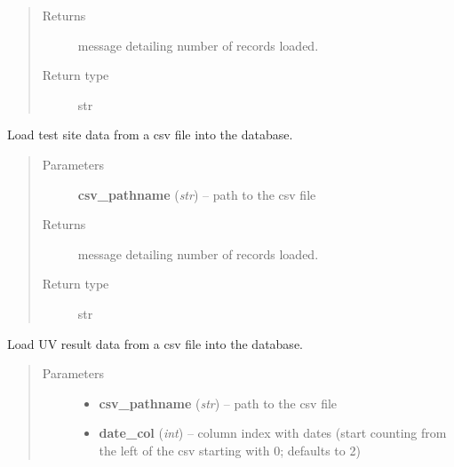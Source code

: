 \documentclass[letterpaper,10pt,english]{sphinxmanual}
\begin{document}
\begin{fulllineitems}
\begin{fulllineitems}
\begin{quote}
\begin{description}
\item[{Returns}] \leavevmode
message detailing number of records loaded.

\item[{Return type}] \leavevmode
str

\end{description}\end{quote}

\end{fulllineitems}


\begin{fulllineitems}
\label{modules:webb_utils.upload_data.UploadData.load_test_site_data}
Load test site data from a csv file into the database.
\begin{quote}\begin{description}
\item[{Parameters}] \leavevmode
\textbf{csv\_pathname} (\emph{str}) -- path to the csv file

\item[{Returns}] \leavevmode
message detailing number of records loaded.

\item[{Return type}] \leavevmode
str

\end{description}\end{quote}

\end{fulllineitems}


\begin{fulllineitems}
\label{modules:webb_utils.upload_data.UploadData.load_uv_results_data}
Load UV result data from a csv file into the database.
\begin{quote}\begin{description}
\item[{Parameters}] \leavevmode\begin{itemize}
\item {} 
\textbf{csv\_pathname} (\emph{str}) -- path to the csv file

\item {} 
\textbf{date\_col} (\emph{int}) -- column index with dates (start counting from the left of the csv starting with 0; defaults to 2)


\end{itemize}
\end{description}
\end{quote}
\end{fulllineitems}
\end{fulllineitems}
\end{document}
